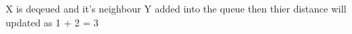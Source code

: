 \documentclass[preview]{standalone}
\begin{document}
\begin{center}
X is deqeued and it's neighbour Y added into the queue then thier distance will updated as 1 + 2 = 3
\end{center}
\end{document}
